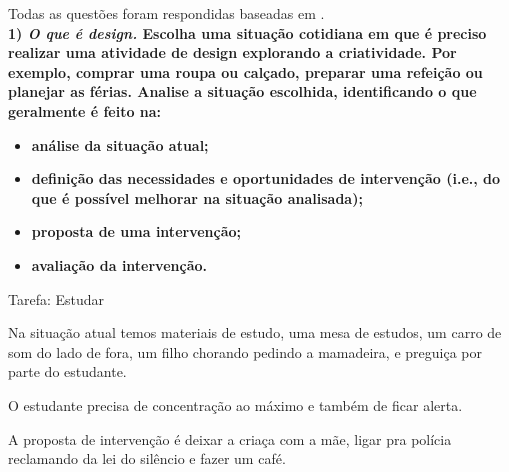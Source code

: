 \documentclass[
	article,			%
	11pt,				%
	oneside,			%
	a4paper,			%
	english,			%
	brazil,				%
	sumario=tradicional
	]{abntex2}
\begin{document}
\frenchspacing 



\maketitle



\textual


Todas as questões foram respondidas baseadas em .\\

\textbf{1) \textit{O que é design.} Escolha uma situação cotidiana em que é preciso realizar uma atividade de design explorando a criatividade. Por exemplo, comprar uma roupa ou calçado, preparar uma refeição ou planejar as férias. Analise a situação escolhida, identificando o que geralmente é feito na:}

\begin{itemize}
	\item \textbf{análise da situação atual;}
	\item \textbf{definição das necessidades e oportunidades de intervenção (i.e., do que é possível melhorar na situação analisada);}
	\item \textbf{proposta de uma intervenção;}
	\item \textbf{avaliação da intervenção.}
\end{itemize}

Tarefa: Estudar

Na situação atual temos materiais de estudo, uma mesa de estudos, um carro de som do lado de fora, um filho chorando pedindo a mamadeira, e preguiça por parte do estudante.



O estudante precisa de concentração ao máximo e também de ficar alerta.

A proposta de intervenção é deixar a criaça com a mãe, ligar pra polícia reclamando da lei do silêncio e fazer um café.
\end{document}
